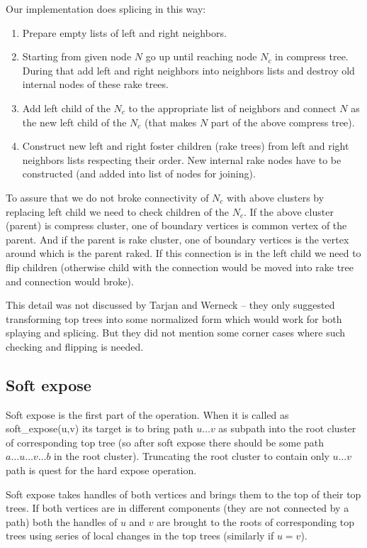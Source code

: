 Our implementation does splicing in this way:
\begin{enumerate}
\item Prepare empty lists of left and right neighbors.
\item Starting from given node $N$ go up until reaching node $N_c$ in compress
tree. During that add left and right neighbors into neighbors lists and destroy
old internal nodes of these rake trees.
\item Add left child of the $N_c$ to the appropriate list of neighbors and
connect $N$ as the new left child of the $N_c$ (that makes $N$ part of the above
compress tree).
\item Construct new left and right foster children (rake trees) from left and
right neighbors lists respecting their order. New internal rake nodes have
to be constructed (and added into list of nodes for joining).
\end{enumerate}

To assure that we do not broke connectivity of $N_c$ with above clusters by
replacing left child we need to check children of the $N_c$. If the above
cluster (parent) is compress cluster, one of boundary vertices is common vertex
of the parent. And if the parent is rake cluster, one of boundary vertices is
the vertex around which is the parent raked. If this connection is in the left
child we need to flip children (otherwise child with the connection would be
moved into rake tree and connection would broke).

This detail was not discussed by Tarjan and Werneck -- they only suggested
transforming top trees into some normalized form which would work for both
splaying and splicing. But they did not mention some corner cases where such
checking and flipping is needed.

\subsection{Soft expose}

Soft expose is the first part of the \Expose{} operation. When it is called as
{\I soft\_expose(u,v)} its target is to bring path $u\dots v$ as subpath into
the root cluster of corresponding top tree (so after soft expose there should
be some path $a\dots u\dots v\dots b$ in the root cluster). Truncating the root
cluster to contain only $u\dots v$ path is quest for the hard expose operation.

Soft expose takes handles of both vertices and brings them to the top of their
top trees. If both vertices are in different components (they are not connected
by a path) both the handles of $u$ and $v$ are brought to the roots of
corresponding top trees using series of local changes in the top trees
(similarly if $u=v$).


